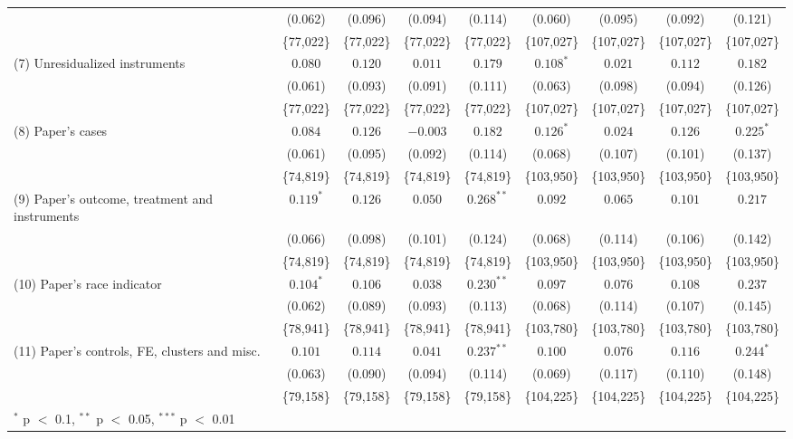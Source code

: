 \begin{tabular}{lcccccccc}
 & (0.062) & (0.096) & (0.094) & (0.114) & (0.060) & (0.095) & (0.092) & (0.121) \\
 & \{77,022\} & \{77,022\} & \{77,022\} & \{77,022\} & \{107,027\} & \{107,027\} & \{107,027\} & \{107,027\} \\
(7) Unresidualized instruments & $0.080$ & $0.120$ & $0.011$ & $0.179$ & $0.108^{*}$ & $0.021$ & $0.112$ & $0.182$ \\
 & (0.061) & (0.093) & (0.091) & (0.111) & (0.063) & (0.098) & (0.094) & (0.126) \\
 & \{77,022\} & \{77,022\} & \{77,022\} & \{77,022\} & \{107,027\} & \{107,027\} & \{107,027\} & \{107,027\} \\
(8) Paper's cases & $0.084$ & $0.126$ & $-0.003$ & $0.182$ & $0.126^{*}$ & $0.024$ & $0.126$ & $0.225^{*}$ \\
 & (0.061) & (0.095) & (0.092) & (0.114) & (0.068) & (0.107) & (0.101) & (0.137) \\
 & \{74,819\} & \{74,819\} & \{74,819\} & \{74,819\} & \{103,950\} & \{103,950\} & \{103,950\} & \{103,950\} \\
(9) Paper's outcome, treatment and instruments & $0.119^{*}$ & $0.126$ & $0.050$ & $0.268^{**}$ & $0.092$ & $0.065$ & $0.101$ & $0.217$ \\
 & (0.066) & (0.098) & (0.101) & (0.124) & (0.068) & (0.114) & (0.106) & (0.142) \\
 & \{74,819\} & \{74,819\} & \{74,819\} & \{74,819\} & \{103,950\} & \{103,950\} & \{103,950\} & \{103,950\} \\
(10) Paper's race indicator & $0.104^{*}$ & $0.106$ & $0.038$ & $0.230^{**}$ & $0.097$ & $0.076$ & $0.108$ & $0.237$ \\
 & (0.062) & (0.089) & (0.093) & (0.113) & (0.068) & (0.114) & (0.107) & (0.145) \\
 & \{78,941\} & \{78,941\} & \{78,941\} & \{78,941\} & \{103,780\} & \{103,780\} & \{103,780\} & \{103,780\} \\
(11) Paper's controls, FE, clusters and misc. & $0.101$ & $0.114$ & $0.041$ & $0.237^{**}$ & $0.100$ & $0.076$ & $0.116$ & $0.244^{*}$ \\
 & (0.063) & (0.090) & (0.094) & (0.114) & (0.069) & (0.117) & (0.110) & (0.148) \\
 & \{79,158\} & \{79,158\} & \{79,158\} & \{79,158\} & \{104,225\} & \{104,225\} & \{104,225\} & \{104,225\} \\
\bottomrule
\multicolumn{9}{l}{\footnotesize $^{*}$ p $<$ 0.1, $^{**}$ p $<$ 0.05, $^{***}$ p $<$ 0.01} \\
\end{tabular}
